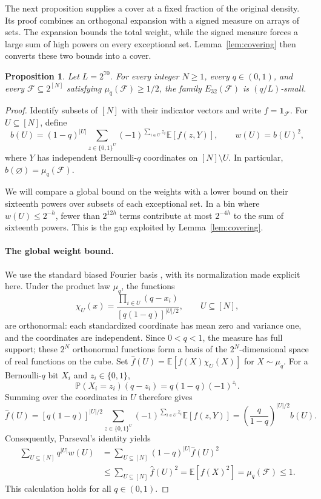 \documentclass[11pt,letterpaper]{article}
\newtheorem{proposition}[theorem]{Proposition}
\theoremstyle{definition}
\theoremstyle{remark}
\numberwithin{equation}{section}
\begin{document}
The next proposition supplies a cover at a fixed fraction of the original
density. Its proof combines an orthogonal expansion with a signed measure
on arrays of sets. The expansion bounds the total weight, while the signed
measure forces a large sum of high powers on every exceptional set.
Lemma~\ref{lem:covering} then converts these two bounds into a cover.

\begin{proposition}\label{prop:half-density}
Let $L=2^{70}$. For every integer $N\ge1$, every $q\in(0,1)$, and every
$\mathcal F\subseteq 2^{[N]}$ satisfying $\mu_q(\mathcal F)\ge1/2$,
the family $E_{32}(\mathcal F)$ is $(q/L)$-small.
\end{proposition}

\begin{proof}
Identify subsets of $[N]$ with their indicator vectors and write
$f=\mathbf 1_{\mathcal F}$. For $U\subseteq[N]$, define
\begin{equation}\label{eq:weights-definition}
 b(U)=(1-q)^{|U|}
 \sum_{z\in\{0,1\}^{U}}(-1)^{\sum_{i\in U}z_i}
 \mathbb E[f(z,Y)],
 \qquad w(U)=b(U)^2,
\end{equation}
where $Y$ has independent Bernoulli-$q$ coordinates on $[N]\setminus U$.
In particular, $b(\varnothing)=\mu_q(\mathcal F)$.

We will compare a global bound on the weights with a lower bound on
their sixteenth powers over subsets of each exceptional set.
In a bin where $w(U)\le2^{-h}$, fewer than $2^{12h}$ terms contribute
at most $2^{-4h}$ to the sum of sixteenth powers. This is the gap
exploited by Lemma~\ref{lem:covering}.

\paragraph{The global weight bound.}
We use the standard biased Fourier basis
\cite[Section~8.4]{ODonnell14}, with its normalization made explicit here.
Under the product law $\mu_q$, the functions
\[
 \chi_U(x)=\frac{\prod_{i\in U}(q-x_i)}{[q(1-q)]^{|U|/2}},
 \qquad U\subseteq[N],
\]
are orthonormal: each standardized coordinate has mean zero
and variance one, and the coordinates are independent. Since $0<q<1$, the measure has
full support; these $2^N$ orthonormal functions form a basis of the
$2^N$-dimensional space of real functions on the cube. Set
$\widehat f(U)=\mathbb E[f(X)\chi_U(X)]$ for $X\sim\mu_q$.
For a Bernoulli-$q$ bit $X_i$ and $z_i\in\{0,1\}$,
\[
 \mathbb P(X_i=z_i)(q-z_i)=q(1-q)(-1)^{z_i}.
\]
Summing over the coordinates in $U$ therefore gives
\[
 \widehat f(U)
 =[q(1-q)]^{|U|/2}
 \sum_{z\in\{0,1\}^{U}}(-1)^{\sum_{i\in U}z_i}
 \mathbb E[f(z,Y)]
 =\left(\frac{q}{1-q}\right)^{|U|/2}b(U).
\]
Consequently, Parseval's identity yields
\begin{equation}\label{eq:global-weight-bound}
 \begin{aligned}
 \sum_{U\subseteq[N]}q^{|U|}w(U)
 &=\sum_{U\subseteq[N]}(1-q)^{|U|}\widehat f(U)^2\\
 &\le\sum_{U\subseteq[N]}\widehat f(U)^2
 =\mathbb E[f(X)^2]
 =\mu_q(\mathcal F)\le1.
 \end{aligned}
\end{equation}
This calculation holds for all $q\in(0,1)$.


\end{proof}
\end{document}
